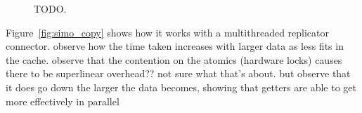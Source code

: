 \begin{figure}
{\begin{subfigure}[b]{0.63\textwidth}
			\caption{}
			\label{fig:exper_rtt_01}
		\end{subfigure}%
	}
	\caption[TODO]{TODO.}
	\label{fig:exper_rtt}
\end{figure}


Figure~\ref{fig:simo_copy} shows how it works with a multithreaded replicator connector. observe how the time taken increases with larger data as less fits in the cache. observe that the contention on the atomics (hardware locks) causes there to be superlinear overhead?? not sure what that's about. but observe that it does go down the larger the data becomes, showing that getters are able to get more effectively in parallel
\begin{figure}
	\centering
\end{figure}
